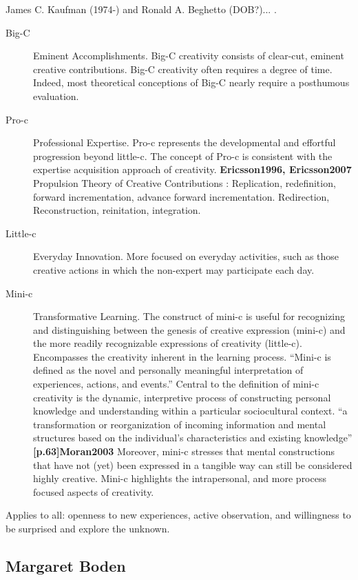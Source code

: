 James C. Kaufman (1974-) and Ronald A. Beghetto (DOB?)... \citep[See][]{Kaufman2009}.

\begin{description}
  \item [Big-C] Eminent Accomplishments. Big-C creativity consists of clear-cut, eminent creative contributions. Big-C creativity often requires a degree of time. Indeed, most theoretical conceptions of Big-C nearly require a posthumous evaluation.
  \item [Pro-c] Professional Expertise. Pro-c represents the developmental and effortful progression beyond little-c. The concept of Pro-c is consistent with the expertise acquisition approach of creativity. \textbf{Ericsson1996, Ericsson2007} Propulsion Theory of Creative Contributions \citep{Sternberg1999, Sternberg2006}: Replication, redefinition, forward incrementation, advance forward incrementation. Redirection, Reconstruction, reinitation, integration.
  \item [Little-c] Everyday Innovation. More focused on everyday activities, such as those creative actions in which the non-expert may participate each day.
  \item [Mini-c] Transformative Learning. The construct of mini-c is useful for recognizing and distinguishing between the genesis of creative expression (mini-c) and the more readily recognizable expressions of creativity (little-c). Encompasses the creativity inherent in the learning process. ``Mini-c is defined as the novel and personally meaningful interpretation of experiences, actions, and events.'' \citep{Beghetto2007} Central to the definition of mini-c creativity is the dynamic, interpretive process of constructing personal knowledge and understanding within a particular sociocultural context. ``a transformation or reorganization of incoming information and mental structures based on the individual's characteristics and existing knowledge'' \textbf{[p.63]Moran2003} Moreover, mini-c stresses that mental constructions that have not (yet) been expressed in a tangible way can still be considered highly creative. Mini-c highlights the intrapersonal, and more process focused aspects of creativity.
\end{description}

Applies to all: openness to new experiences, active observation, and willingness to be surprised and explore the unknown.

\subsection{Margaret Boden}

